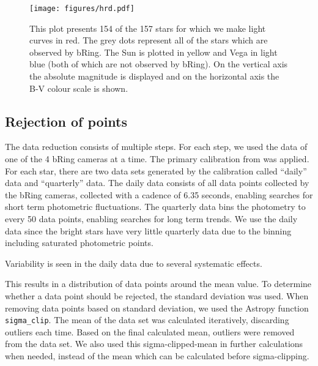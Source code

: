 \documentclass{aa}
\begin{document}
\begin{figure}
    \centering
    \texttt{[image: figures/hrd.pdf]}
    \caption{This plot presents 154 of the 157 stars for which we make light curves in red.
      The grey dots represent all of the stars which are observed by bRing.
      The Sun is plotted in yellow and Vega in light blue (both of which are not observed by bRing).
      On the vertical axis the absolute magnitude is displayed and on the horizontal axis the B-V colour scale is shown.}
    \label{HRD}
  \end{figure}

\subsection{Rejection of points}

%
The data reduction consists of multiple steps.
%
For each step, we used the data of one of the 4 bRing cameras at a time.
%
The primary calibration from \cite{Talens_2018} was applied.
%
For each star, there are two data sets generated by the calibration called ``daily'' data and ``quarterly'' data.
%
The daily data consists of all data points collected by the bRing cameras, collected with a cadence of 6.35 seconds, enabling searches for short term photometric fluctuations.
%
The quarterly data bins the photometry to every 50 data points, enabling searches for long term trends.
%
We use the daily data since the bright stars have very little quarterly data due to the binning including saturated photometric points.

Variability is seen in the daily data due to several systematic effects.

%
This results in a distribution of data points around the mean value. To determine whether a data point should be rejected, the standard deviation was used.
%
When removing data points based on standard deviation, we used the Astropy function \texttt{sigma\_clip}.
%
The mean of the data set was calculated iteratively, discarding outliers each time.
%
Based on the final calculated mean, outliers were removed from the data set.
%
We also used this sigma-clipped-mean in further calculations when needed, instead of the mean which can be calculated before sigma-clipping.
\end{document}
